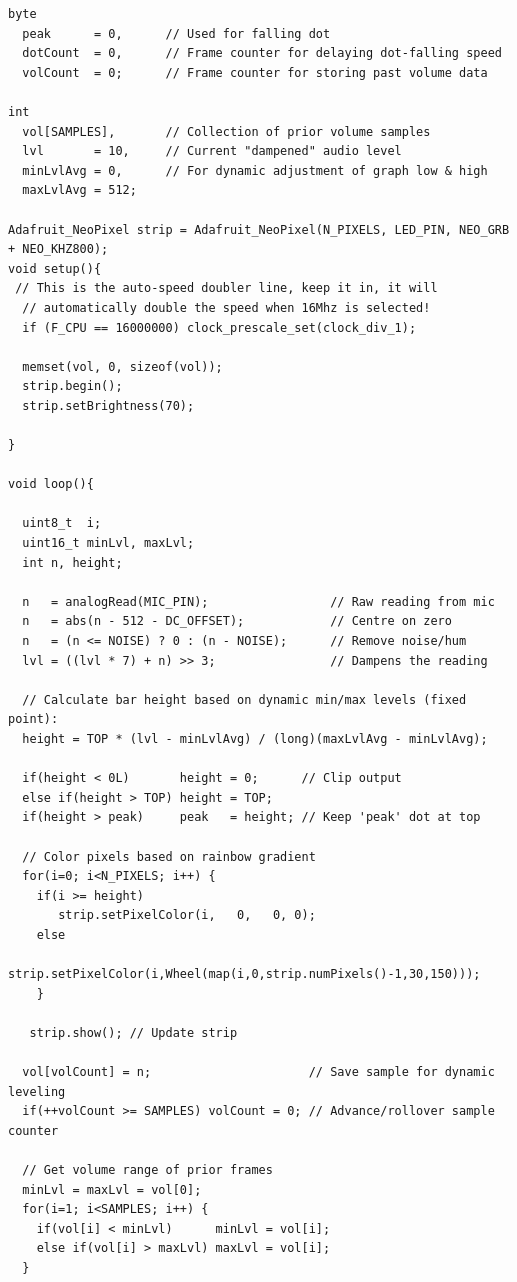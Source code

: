 \documentclass[paper=a4, fontsize=11pt]{scrartcl}
\numberwithin{equation}{section}		%
\numberwithin{figure}{section}			%
\numberwithin{table}{section}				%
\begin{document}
{\begin{verbatim}
byte
  peak      = 0,      // Used for falling dot
  dotCount  = 0,      // Frame counter for delaying dot-falling speed
  volCount  = 0;      // Frame counter for storing past volume data
  
int
  vol[SAMPLES],       // Collection of prior volume samples
  lvl       = 10,     // Current "dampened" audio level
  minLvlAvg = 0,      // For dynamic adjustment of graph low & high
  maxLvlAvg = 512;
 
Adafruit_NeoPixel strip = Adafruit_NeoPixel(N_PIXELS, LED_PIN, NEO_GRB + NEO_KHZ800);
void setup(){
 // This is the auto-speed doubler line, keep it in, it will
  // automatically double the speed when 16Mhz is selected!
  if (F_CPU == 16000000) clock_prescale_set(clock_div_1);
  
  memset(vol, 0, sizeof(vol));
  strip.begin();
  strip.setBrightness(70);

}
 
void loop(){   

  uint8_t  i;
  uint16_t minLvl, maxLvl;
  int n, height;
  
  n   = analogRead(MIC_PIN);                 // Raw reading from mic 
  n   = abs(n - 512 - DC_OFFSET);            // Centre on zero
  n   = (n <= NOISE) ? 0 : (n - NOISE);      // Remove noise/hum
  lvl = ((lvl * 7) + n) >> 3;                // Dampens the reading
  
  // Calculate bar height based on dynamic min/max levels (fixed point):
  height = TOP * (lvl - minLvlAvg) / (long)(maxLvlAvg - minLvlAvg);
 
  if(height < 0L)       height = 0;      // Clip output
  else if(height > TOP) height = TOP;
  if(height > peak)     peak   = height; // Keep 'peak' dot at top
 
  // Color pixels based on rainbow gradient
  for(i=0; i<N_PIXELS; i++) {  
    if(i >= height)               
       strip.setPixelColor(i,   0,   0, 0);
    else 
       strip.setPixelColor(i,Wheel(map(i,0,strip.numPixels()-1,30,150)));
    } 
 
   strip.show(); // Update strip
 
  vol[volCount] = n;                      // Save sample for dynamic leveling
  if(++volCount >= SAMPLES) volCount = 0; // Advance/rollover sample counter
 
  // Get volume range of prior frames
  minLvl = maxLvl = vol[0];
  for(i=1; i<SAMPLES; i++) {
    if(vol[i] < minLvl)      minLvl = vol[i];
    else if(vol[i] > maxLvl) maxLvl = vol[i];
  }
  

\end{verbatim}}
\end{document}
